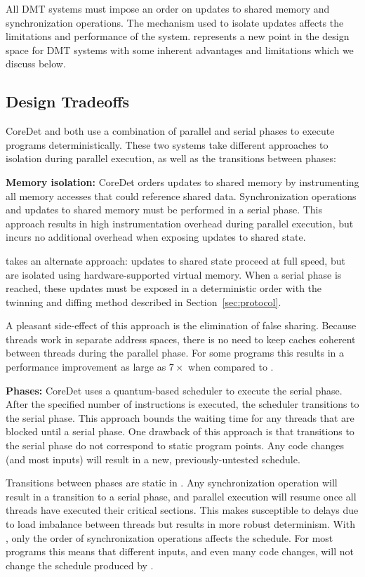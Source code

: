 \label{sec:discussion} All DMT systems must
impose an order on updates to shared memory and synchronization operations.  The
mechanism used to isolate updates affects the limitations and performance of the
system.  \dthreads{} represents a new point in the design space for DMT systems
with some inherent advantages and limitations which we discuss below.

\subsection{Design Tradeoffs} CoreDet and \dthreads{} both use a combination of
parallel and serial phases to execute programs deterministically.  These two
systems take different approaches to isolation during parallel execution, as
well as the transitions between phases:

\textbf{Memory isolation:} CoreDet orders updates to shared memory by
instrumenting all memory accesses that could reference shared data. 
Synchronization operations and updates to shared memory must be performed in a
serial phase.  This approach results in high instrumentation overhead during
parallel execution, but incurs no additional overhead when exposing updates to
shared state.

\dthreads{} takes an alternate approach: updates to shared state proceed at full
speed, but are isolated using hardware-supported virtual memory.  When a serial
phase is reached, these updates must be exposed in a deterministic order with
the twinning and diffing method described in Section~\ref{sec:protocol}.

A pleasant side-effect of this approach is the elimination of false sharing. 
Because threads work in separate address spaces, there is no need to keep caches
coherent between threads during the parallel phase.  For some programs this
results in a performance improvement as large as $7\times$ when compared to
\pthreads{}.

\textbf{Phases:} CoreDet uses a quantum-based scheduler to execute the serial
phase.  After the specified number of instructions is executed, the scheduler
transitions to the serial phase.  This approach bounds the waiting time for any
threads that are blocked until a serial phase.  One drawback of this approach is
that transitions to the serial phase do not correspond to static program points.  Any code changes (and most inputs) will result in a new, previously-untested schedule.

Transitions between phases are static in \dthreads{}.  Any synchronization
operation will result in a transition to a serial phase, and parallel execution
will resume once all threads have executed their critical sections.  This makes
\dthreads{} susceptible to delays due to load imbalance between threads but
results in more robust determinism.  With \dthreads{}, only the
order of synchronization operations affects the schedule.  For most programs
this means that different inputs, and even many code changes, will not change
the schedule produced by \dthreads{}.

